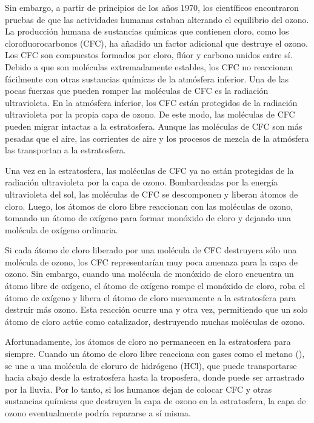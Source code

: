 Sin embargo, a partir de principios de los años 1970, los científicos encontraron pruebas de que las actividades humanas estaban alterando el equilibrio del ozono. La producción humana de sustancias químicas que contienen cloro, como los clorofluorocarbonos (CFC), ha añadido un factor adicional que destruye el ozono. Los CFC son compuestos formados por cloro, flúor y carbono unidos entre sí. Debido a que son moléculas extremadamente estables, los CFC no reaccionan fácilmente con otras sustancias químicas de la atmósfera inferior. Una de las pocas fuerzas que pueden romper las moléculas de CFC es la radiación ultravioleta. En la atmósfera inferior, los CFC están protegidos de la radiación ultravioleta por la propia capa de ozono. De este modo, las moléculas de CFC pueden migrar intactas a la estratosfera. Aunque las moléculas de CFC son más pesadas que el aire, las corrientes de aire y los procesos de mezcla de la atmósfera las transportan a la estratosfera.

Una vez en la estratosfera, las moléculas de CFC ya no están protegidas de la radiación ultravioleta por la capa de ozono. Bombardeadas por la energía ultravioleta del sol, las moléculas de CFC se descomponen y liberan átomos de cloro. Luego, los átomos de cloro libre reaccionan con las moléculas de ozono, tomando un átomo de oxígeno para formar monóxido de cloro y dejando una molécula de oxígeno ordinaria.

Si cada átomo de cloro liberado por una molécula de CFC destruyera sólo una molécula de ozono, los CFC representarían muy poca amenaza para la capa de ozono. Sin embargo, cuando una molécula de monóxido de cloro encuentra un átomo libre de oxígeno, el átomo de oxígeno rompe el monóxido de cloro, roba el átomo de oxígeno y libera el átomo de cloro nuevamente a la estratosfera para destruir más ozono. Esta reacción ocurre una y otra vez, permitiendo que un solo átomo de cloro actúe como catalizador, destruyendo muchas moléculas de ozono.

Afortunadamente, los átomos de cloro no permanecen en la estratosfera para siempre. Cuando un átomo de cloro libre reacciona con gases como el metano (), se une a una molécula de cloruro de hidrógeno (HCl), que puede transportarse hacia abajo desde la estratosfera hasta la troposfera, donde puede ser arrastrado por la lluvia. Por lo tanto, si los humanos dejan de colocar CFC y otras sustancias químicas que destruyen la capa de ozono en la estratosfera, la capa de ozono eventualmente podría repararse a sí misma.

